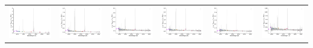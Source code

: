 \begin{center}
\begin{longtable}{l l l l l l }
    \includegraphics[width=0.3\linewidth, clip]{Figs/Figs-sdss/spec-1511-52946-0192-STRIPE82-0059-038994.pdf} & \includegraphics[width=0.3\linewidth, clip]{Figs/Figs-sdss/spec-1512-53742-0281-STRIPE82-0061-012261.pdf} & \includegraphics[width=0.3\linewidth, clip]{Figs/Figs-sdss/spec-1512-53742-0296-STRIPE82-0061-011773.pdf} & \includegraphics[width=0.3\linewidth, clip]{Figs/Figs-sdss/spec-1512-53742-0351-STRIPE82-0061-059714.pdf} & \includegraphics[width=0.3\linewidth, clip]{Figs/Figs-sdss/spec-1512-53742-0430-STRIPE82-0064-022463.pdf} & \includegraphics[width=0.3\linewidth, clip]{Figs/Figs-sdss/spec-1512-53742-0471-STRIPE82-0064-008459.pdf} \\

\end{longtable}
\end{center}

